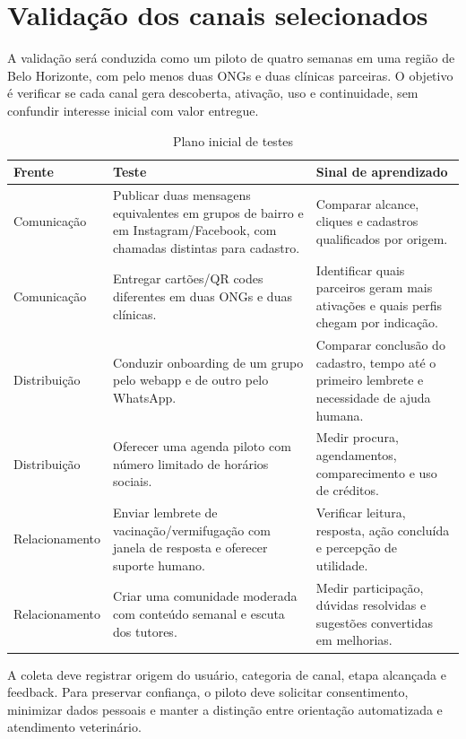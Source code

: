 \section{Validação dos canais selecionados}
\label{sec:validacao}

A validação será conduzida como um piloto de quatro semanas em uma região de Belo Horizonte, com pelo menos duas ONGs e duas clínicas parceiras. O objetivo é verificar se cada canal gera descoberta, ativação, uso e continuidade, sem confundir interesse inicial com valor entregue.

\begin{table}[htbp]
\centering\small
\caption{Plano inicial de testes}
\label{tab:testes}
\begin{tabularx}{\textwidth}{p{}p{}Y}
\toprule
\textbf{Frente} & \textbf{Teste} & \textbf{Sinal de aprendizado}\\
\midrule
Comunicação & Publicar duas mensagens equivalentes em grupos de bairro e em Instagram/Facebook, com chamadas distintas para cadastro. & Comparar alcance, cliques e cadastros qualificados por origem.\\
Comunicação & Entregar cartões/QR codes diferentes em duas ONGs e duas clínicas. & Identificar quais parceiros geram mais ativações e quais perfis chegam por indicação.\\
Distribuição & Conduzir onboarding de um grupo pelo webapp e de outro pelo WhatsApp. & Comparar conclusão do cadastro, tempo até o primeiro lembrete e necessidade de ajuda humana.\\
Distribuição & Oferecer uma agenda piloto com número limitado de horários sociais. & Medir procura, agendamentos, comparecimento e uso de créditos.\\
Relacionamento & Enviar lembrete de vacinação/vermifugação com janela de resposta e oferecer suporte humano. & Verificar leitura, resposta, ação concluída e percepção de utilidade.\\
Relacionamento & Criar uma comunidade moderada com conteúdo semanal e escuta dos tutores. & Medir participação, dúvidas resolvidas e sugestões convertidas em melhorias.\\
\bottomrule
\end{tabularx}
\end{table}

A coleta deve registrar origem do usuário, categoria de canal, etapa alcançada e feedback. Para preservar confiança, o piloto deve solicitar consentimento, minimizar dados pessoais e manter a distinção entre orientação automatizada e atendimento veterinário.
